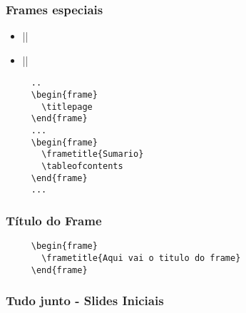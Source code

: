 
\begin{frame}[fragile]
  \frametitle{Frames especiais}

  \begin{itemize}
     \item {}|\titlepage|
     \item {}|\tableofcontents[\pausesections] |
  \end{itemize}

   \begin{verbatim}
     ..
     \begin{frame}
       \titlepage
     \end{frame}
     ...
     \begin{frame}
       \frametitle{Sumario}
       \tableofcontents
     \end{frame}
     ...
  \end{verbatim}

\end{frame}


\begin{frame}[fragile]
  \frametitle{Título do Frame}

   \begin{verbatim}
     \begin{frame}
       \frametitle{Aqui vai o titulo do frame}
     \end{frame}
   \end{verbatim}

\end{frame}


\begin{frame}
  \frametitle{Tudo junto - Slides Iniciais}
  \inputminted[linenos,fontsize=\scriptsize]{tex}{codes/04-template-inicial.tex}
\end{frame}

